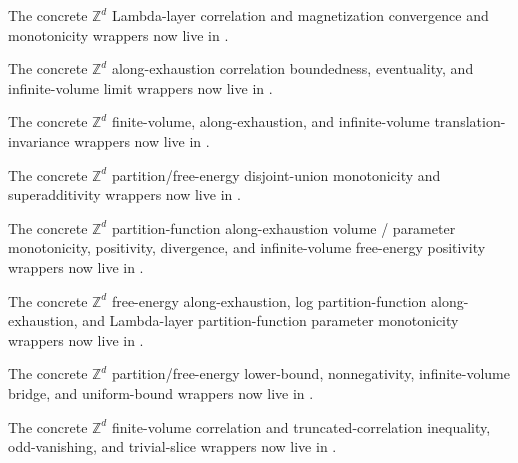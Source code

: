 \documentclass[a4paper,11pt]{article}
\begin{document}
{\raggedright
The concrete $\mathbb{Z}^d$ Lambda-layer correlation and magnetization
convergence and monotonicity wrappers now live in
.
\par}

{\raggedright
The concrete $\mathbb{Z}^d$ along-exhaustion correlation boundedness,
eventuality, and infinite-volume limit wrappers now live in
.
\par}

{\raggedright
The concrete $\mathbb{Z}^d$ finite-volume, along-exhaustion, and
infinite-volume translation-invariance wrappers now live in
.
\par}

{\raggedright
The concrete $\mathbb{Z}^d$ partition/free-energy disjoint-union monotonicity
and superadditivity wrappers now live in
.
\par}

{\raggedright
The concrete $\mathbb{Z}^d$ partition-function along-exhaustion volume /
parameter monotonicity, positivity, divergence, and infinite-volume free-energy
positivity wrappers now live in
.
\par}

{\raggedright
The concrete $\mathbb{Z}^d$ free-energy along-exhaustion,
log partition-function along-exhaustion, and Lambda-layer partition-function
parameter monotonicity wrappers now live in
.
\par}

{\raggedright
The concrete $\mathbb{Z}^d$ partition/free-energy lower-bound,
nonnegativity, infinite-volume bridge, and uniform-bound wrappers now live in
.
\par}

{\raggedright
The concrete $\mathbb{Z}^d$ finite-volume correlation and
truncated-correlation inequality, odd-vanishing, and trivial-slice wrappers now
live in
.
\par}
\end{document}
